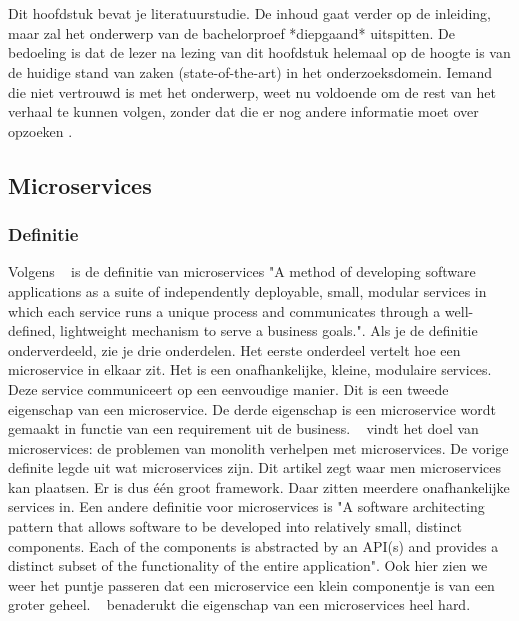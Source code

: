 \chapter{}
\label{ch:stand-van-zaken}



Dit hoofdstuk bevat je literatuurstudie. De inhoud gaat verder op de inleiding, maar zal het onderwerp van de bachelorproef *diepgaand* uitspitten. De bedoeling is dat de lezer na lezing van dit hoofdstuk helemaal op de hoogte is van de huidige stand van zaken (state-of-the-art) in het onderzoeksdomein. Iemand die niet vertrouwd is met het onderwerp, weet nu voldoende om de rest van het verhaal te kunnen volgen, zonder dat die er nog andere informatie moet over opzoeken \autocite{Pollefliet2011}.

\section{Microservices}
\subsection{Definitie}
Volgens ~\cite{Mauersberger2017} is de definitie van microservices "A method of developing software applications as a suite of independently deployable, small, modular services in which each service runs a unique process and communicates through a well-defined, lightweight mechanism to serve a business goals.". Als je de definitie onderverdeeld, zie je drie onderdelen. Het eerste onderdeel vertelt hoe een microservice in elkaar zit. Het is een onafhankelijke, kleine, modulaire services. Deze service communiceert op een eenvoudige manier. Dit is een tweede eigenschap van een microservice. De derde eigenschap is een microservice wordt gemaakt in functie van een requirement uit de business. 
~\cite{series2018} vindt het doel van microservices: de problemen van monolith verhelpen met microservices. De vorige definite legde uit wat microservices zijn. Dit artikel zegt waar men microservices kan plaatsen. Er is dus één groot framework. Daar zitten meerdere onafhankelijke services in.
Een andere definitie voor microservices is "A software architecting pattern that allows software to be developed into relatively small, distinct components. Each of the components is abstracted by an API(s) and provides a distinct subset of the functionality of the entire application". Ook hier zien we weer het puntje passeren dat een microservice een klein componentje is van een groter geheel. ~\cite{series2018} benaderukt die eigenschap van een microservices heel hard. 
